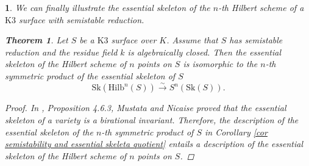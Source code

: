 \documentclass{amsart}%
\numberwithin{equation}{subsection}
\theoremstyle{plain2}
\newtheorem{thm}[equation]{Theorem}
\theoremstyle{definition2}
\newtheorem{rem}[equation]{Remark}
\theoremstyle{stepstyle}
\theoremstyle{point}
\theoremstyle{subpoint}
\newtheorem{subpoint}[equation]{}%
\newcommand{\spa}[1]{\begin{subpoint}#1\end{subpoint}}           %
\newcommand{\Hilb}{\ensuremath{\mathrm{Hilb}}}
\newcommand{\Sk}{\mathrm{Sk}}
\begin{document}
\spa{We can finally illustrate the essential skeleton of the $n$-th Hilbert scheme of a $\text{K}3$ surface with semistable reduction.
\begin{thm}  \label{thm essential skeleton hilb}
Let $S$ be a $\text{K}3$ surface over $K$. Assume that $S$ has  semistable reduction and the residue field $k$ is algebraically closed. Then the essential skeleton of the Hilbert scheme of $n$ points on $S$ is isomorphic to the $n$-th symmetric product of the essential skeleton of $S$ $$\Sk(\Hilb^n(S)) \xrightarrow{\sim} S^n(\Sk(S)).$$ 
\end{thm}
\begin{proof}
In \cite{MustataNicaise}, Proposition 4.6.3, Mustata and Nicaise proved that the essential skeleton of a variety is a birational invariant. Therefore, the description of the essential skeleton of the $n$-th symmetric product of $S$ in Corollary \ref{cor semistability and essential skeleta quotient} entails a description of the essential skeleton of the Hilbert scheme of $n$ points on $S$.
\end{proof}
%
}

\printbibliography
\end{document}
